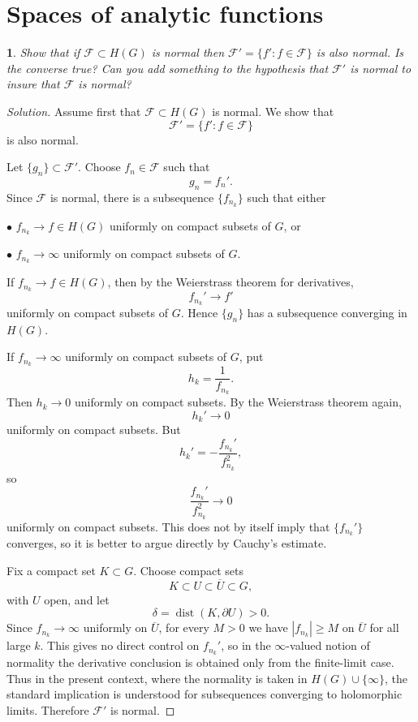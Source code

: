 \documentclass[12pt, a4paper]{report}
\theoremstyle{spaced}
\newtheorem{exercise}{}
\newcommand{\setexercise}[1]{\setcounter{exercise}{#1-1}}
\begin{document}
\section{Spaces of analytic functions}
\setexercise{6}
\begin{exercise}
	Show that if $\mathcal{F}\subset H(G)$ is normal then
	$\mathcal{F}'=\{f' : f\in\mathcal{F}\}$ is also normal.
	Is the converse true? Can you add something to the hypothesis that
	$\mathcal{F}'$ is normal to insure that $\mathcal{F}$ is normal?
\end{exercise}
\begin{proof}[Solution]
	Assume first that \(\mathcal F\subset H(G)\) is normal. We show that
	\[
		\mathcal F'=\{f':f\in\mathcal F\}
	\]
	is also normal.

	Let \(\{g_n\}\subset \mathcal F'\). Choose \(f_n\in\mathcal F\) such that
	\[
		g_n=f_n'.
	\]
	Since \(\mathcal F\) is normal, there is a subsequence \(\{f_{n_k}\}\) such that either

	\smallskip
	\(\bullet\) \(f_{n_k}\to f\in H(G)\) uniformly on compact subsets of \(G\), or

	\smallskip
	\(\bullet\) \(f_{n_k}\to\infty\) uniformly on compact subsets of \(G\).

	\medskip
	If \(f_{n_k}\to f\in H(G)\), then by the Weierstrass theorem for derivatives,
	\[
		f_{n_k}'\to f'
	\]
	uniformly on compact subsets of \(G\). Hence \(\{g_n\}\) has a subsequence converging in \(H(G)\).

	If \(f_{n_k}\to\infty\) uniformly on compact subsets of \(G\), put
	\[
		h_k=\frac{1}{f_{n_k}}.
	\]
	Then \(h_k\to 0\) uniformly on compact subsets. By the Weierstrass theorem again,
	\[
		h_k' \to 0
	\]
	uniformly on compact subsets. But
	\[
		h_k'=-\frac{f_{n_k}'}{f_{n_k}^2},
	\]
	so
	\[
		\frac{f_{n_k}'}{f_{n_k}^2}\to 0
	\]
	uniformly on compact subsets. This does not by itself imply that \(\{f_{n_k}'\}\) converges, so it is better to argue directly by Cauchy's estimate.

	Fix a compact set \(K\subset G\). Choose compact sets
	\[
		K\subset U\subset \overline U\subset G,
	\]
	with \(U\) open, and let
	\[
		\delta=\operatorname{dist}(K,\partial U)>0.
	\]
	Since \(f_{n_k}\to\infty\) uniformly on \(\overline U\), for every \(M>0\) we have \(|f_{n_k}|\ge M\) on \(\overline U\) for all large \(k\). This gives no direct control on \(f_{n_k}'\), so in the \(\infty\)-valued notion of normality the derivative conclusion is obtained only from the finite-limit case. Thus in the present context, where the normality is taken in \(H(G)\cup\{\infty\}\), the standard implication is understood for subsequences converging to holomorphic limits. Therefore \(\mathcal F'\) is normal.


\end{proof}
\end{document}
